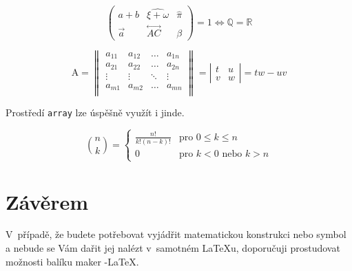 \documentclass[11pt,twocolumn,a4paper]{article}
\theoremstyle{definition}
\theoremstyle{plain}
\begin{document}
$$
\left(
\begin{array}{ccc}
a+b & \widehat{\xi + \omega} & \hat{\pi} \\
\vec{a} & \overset{\longleftrightarrow}{AC} & \beta
\end{array}
\right)
= 1 \iff \mathbb{Q} = \mathbb{R}
$$

$$
\text{A} = 
\left\rVert
\begin{array}{cccc}
a_{11} & a_{12} & \ldots & a_{1n} \\
a_{21} & a_{22} & \ldots & a_{2n} \\
\vdots & \vdots & \ddots & \vdots \\
a_{m1} & a_{m2} & \ldots & a_{mn} \\
\end{array}
\right\rVert
=
\left|
\begin{array}{cc}
t & u \\
v & w
\end{array}
\right|
= tw-uv
$$

Prostředí \verb|array| lze úspěšně využít i jinde.

$$
\binom{n}{k}
=
\left\{
\begin{array}{ll}
\frac{n!}{k!(n-k)!} & \text{pro } 0 \leq k \leq n \\
0 & \text{pro } k < 0 \text{ nebo } k > n
\end{array}
\right.
$$

\section{Závěrem}
V~případě, že budete potřebovat vyjádřit matematickou konstrukci nebo symbol a nebude se Vám dařit jej nalézt v~samotném \LaTeX u, doporučuji prostudovat možnosti balíku maker \AmS-\LaTeX.
\end{document}
